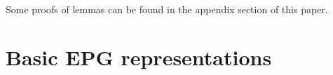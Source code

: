 \documentclass[9pt]{entcs}
\newtheorem{lema}{Lemma}[section]
\newtheorem{coro}{Corollary}[section]
\newtheorem{prove}{Proof}[section]
\begin{document}
 Some proofs of lemmas can be found in the appendix section of this paper.
 
\section{Basic EPG representations}




\end{document}
